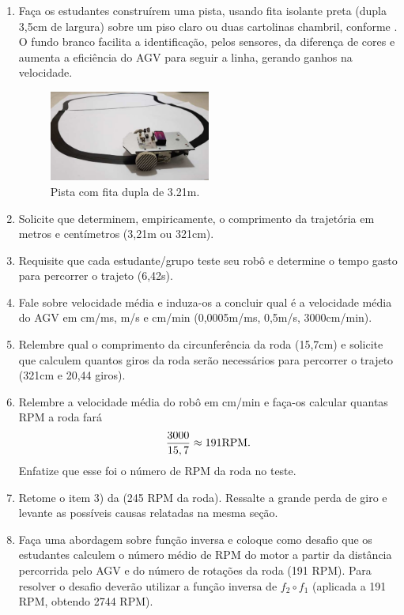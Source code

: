 \documentclass{textolivre}
\begin{document}
\begin{enumerate}
\item Faça os estudantes construírem uma pista, usando fita isolante preta
(dupla 3,5cm de largura) sobre um piso claro ou duas cartolinas chambril,
conforme . O fundo branco facilita a identificação, pelos sensores, da
diferença de cores e aumenta a eficiência do AGV para seguir a linha, gerando
ganhos na velocidade.

\begin{figure}[h!]
\centering
\includegraphics[width=0.5\textwidth]{figure-28.pdf}
\caption{Pista com fita dupla de 3.21m.}
\label{fig18}
\end{figure}

\item Solicite que determinem, empiricamente, o comprimento da trajetória em metros e centímetros (3,21m ou 321cm).
\item Requisite que cada estudante/grupo teste seu robô e determine o tempo gasto para percorrer o trajeto (6,42s).
\item Fale sobre velocidade média e induza-os a concluir qual é a velocidade média do AGV em cm/ms, m/s e cm/min (0,0005m/ms, 0,5m/s, 3000cm/min).
\item Relembre qual o comprimento da circunferência da roda (15,7cm) e solicite
que calculem quantos giros da roda serão necessários para percorrer o trajeto
(321cm e 20,44 giros).
\item\label{itm6} Relembre a velocidade média do robô em cm/min e faça-os calcular quantas
RPM a roda fará 
$$ 
\frac{3000}{15,7} \approx 191 \textmd{RPM}.
$$
Enfatize que esse foi o número de RPM da roda no teste.
\item Retome o item 3) da  (245 RPM da roda). Ressalte a grande
perda de giro e levante as possíveis causas relatadas na mesma seção.
\item Faça uma abordagem sobre função inversa e coloque como desafio que os
estudantes calculem o número médio de RPM do motor a partir da distância
percorrida pelo AGV e do número de rotações da roda (191 RPM). Para resolver o
desafio deverão utilizar a função inversa de $f_2 \circ f_1$ (aplicada a 191
RPM, obtendo 2744 RPM).
\end{enumerate}
\end{document}
